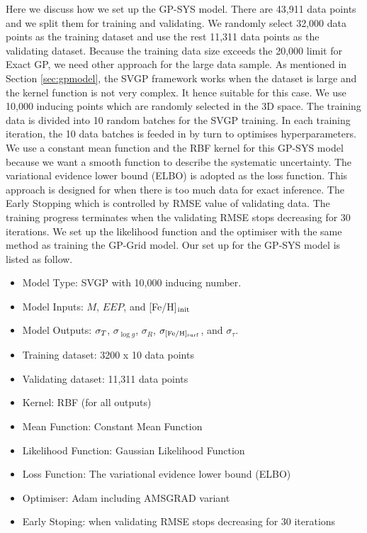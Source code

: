 Here we discuss how we set up the GP-SYS model. 
%
There are 43,911 data points and we split them for training and validating. We randomly select 32,000 data points as the training dataset and use the rest 11,311 data points as the validating dataset. Because the training data size exceeds the 20,000 limit for Exact GP, we need other approach for the large data sample.
%
As mentioned in Section \ref{sec:gpmodel}, the SVGP framework works when the dataset is large and the kernel function is not very complex. It hence suitable for this case. We use 10,000 inducing points which are randomly selected in the 3D space. The training data is divided into 10 random batches for the SVGP training. In each training iteration, the 10 data batches is feeded in by turn to optimises hyperparameters. 
%
We use a constant mean function and the RBF kernel for this GP-SYS model because we want a smooth function to describe the systematic uncertainty. The variational evidence lower bound (ELBO) is adopted as the loss function. This approach is designed for when there is too much data for exact inference. The Early Stopping which is controlled by RMSE value of validating data. The training progress terminates when the validating RMSE stops decreasing for 30 iterations.
We set up the likelihood function and the optimiser with the same method as training the GP-Grid model. 
Our set up for the GP-SYS model is listed as follow.
\begin{itemize}
\item Model Type: SVGP with 10,000 inducing number. 
\item Model Inputs: $M$, $EEP$, and [Fe/H]$_{\rm init}$
\item Model Outputs: $\sigma_{T_{\rm}}$, $\sigma_{\log g}$, $\sigma_{R}$, $\sigma_{\rm [Fe/H]_{surf}}$, and $\sigma_{\tau}$.
\item Training dataset: 3200 x 10 data points
\item Validating dataset: 11,311 data points
\item Kernel: RBF (for all outputs)
\item Mean Function: Constant Mean Function 
\item Likelihood Function: Gaussian Likelihood Function
\item Loss Function: The variational evidence lower bound (ELBO) 
\item Optimiser: Adam including AMSGRAD variant
\item Early Stoping: when validating RMSE stops decreasing for 30 iterations
\end{itemize}    


